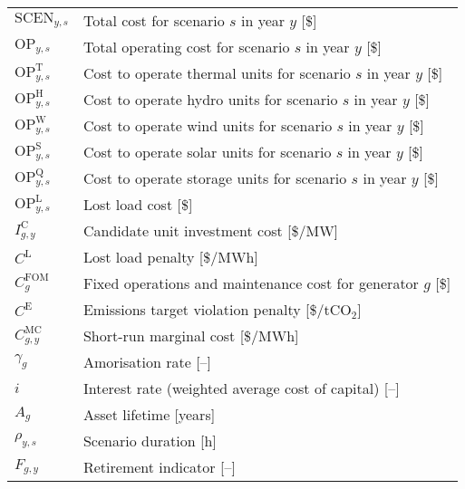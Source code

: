 \documentclass{article}
\newcommand{\iGenerator}{g}
\newcommand{\iYear}{y}
\newcommand{\iScenario}{s}
\newcommand{\cOperatingCost}[1][\iYear,\iScenario]{\mathrm{OP}_{#1}}
\newcommand{\cOperatingCostThermal}[1][\iYear,\iScenario]{\mathrm{OP}^{\mathrm{T}}_{#1}}
\newcommand{\cOperatingCostHydro}[1][\iYear,\iScenario]{\mathrm{OP}^{\mathrm{H}}_{#1}}
\newcommand{\cOperatingCostWind}[1][\iYear,\iScenario]{\mathrm{OP}^{\mathrm{W}}_{#1}}
\newcommand{\cOperatingCostSolar}[1][\iYear,\iScenario]{\mathrm{OP}^{\mathrm{S}}_{#1}}
\newcommand{\cOperatingCostStorage}[1][\iYear,\iScenario]{\mathrm{OP}^{\mathrm{Q}}_{#1}}
\newcommand{\cFixedOperationsMaintenanceCostGenerator}[1][\iGenerator]{C^{\mathrm{FOM}}_{#1}}
\newcommand{\cScenarioDuration}[1][\iYear,\iScenario]{\rho_{#1}}
\newcommand{\cMarginalCost}[1][\iGenerator,\iYear]{C^{\mathrm{MC}}_{#1}}
\newcommand{\cAmortisationRate}[1][\iGenerator]{\gamma_{#1}}
\newcommand{\cCandidateInvestmentCost}[1][\iGenerator,\iYear]{I^{\mathrm{C}}_{#1}}
\newcommand{\cInterestRate}{i}
\newcommand{\cAssetLifetime}[1][\iGenerator]{A_{#1}}
\newcommand{\cOperatingCostLostLoad}[1][\iYear,\iScenario]{\mathrm{OP}^{\mathrm{L}}_{#1}}
\newcommand{\cLostLoadCost}{C^{\mathrm{L}}}
\newcommand{\cEmissionsTargetViolationPenalty}{C^{\mathrm{E}}}
\newcommand{\cOperatingCostScenario}[1][\iYear,\iScenario]{\mathrm{SCEN}_{#1}}
\newcommand{\cRetirementIndicator}[1][\iGenerator,\iYear]{F_{#1}}
\begin{document}
\begin{longtable}{ p{}  p{}}
		$\cOperatingCostScenario$ & Total cost for scenario $\iScenario$ in year $\iYear$ [\$]\\
		$\cOperatingCost$ & Total operating cost for scenario $\iScenario$ in year $\iYear$ [\$]\\
		$\cOperatingCostThermal$ & Cost to operate thermal units for scenario $\iScenario$ in year $\iYear$ [\$]\\
		$\cOperatingCostHydro$ & Cost to operate hydro units for scenario $\iScenario$ in year $\iYear$ [\$]\\
		$\cOperatingCostWind$ & Cost to operate wind units for scenario $\iScenario$ in year $\iYear$ [\$]\\
		$\cOperatingCostSolar$ & Cost to operate solar units for scenario $\iScenario$ in year $\iYear$ [\$]\\
		$\cOperatingCostStorage$ & Cost to operate storage units for scenario $\iScenario$ in year $\iYear$ [\$]\\
		$\cOperatingCostLostLoad$ & Lost load cost [\$]\\
		$\cCandidateInvestmentCost$ & Candidate unit investment cost [\$/MW]\\
		$\cLostLoadCost$ & Lost load penalty [\$/MWh]\\
		$\cFixedOperationsMaintenanceCostGenerator$ & Fixed operations and maintenance cost for generator $\iGenerator$ [\$]\\
		$\cEmissionsTargetViolationPenalty$ & Emissions target violation penalty [\$/tCO$_{2}$]\\
		$\cMarginalCost$ & Short-run marginal cost [\$/MWh]\\
		$\cAmortisationRate$ & Amorisation rate [--]\\
		$\cInterestRate$ & Interest rate (weighted average cost of capital) [--]\\
		$\cAssetLifetime$ & Asset lifetime [years]\\
		$\cScenarioDuration$ & Scenario duration [h]\\
		$\cRetirementIndicator$ & Retirement indicator [--]\\

\end{longtable}
\end{document}
